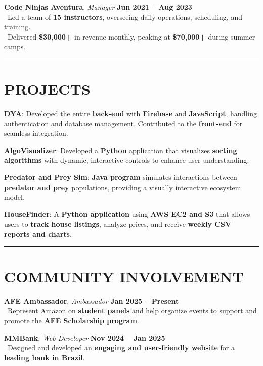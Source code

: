 \documentclass[a4paper,10pt]{article}
\newcommand{\sectionline}{\noindent\rule{\textwidth}{0.6pt}}
\begin{document}
\textbf{Code Ninjas Aventura}, \textit{Manager} \hfill \textbf{Jun 2021 – Aug 2023}\\
\textbullet\ Led a team of \textbf{15 instructors}, overseeing daily operations, scheduling, and training.\\
\textbullet\ Delivered \textbf{\$30,000+} in revenue monthly, peaking at \textbf{\$70,000+} during summer camps.

\sectionline

\section*{PROJECTS}
\begin{compactitem}
\item \textbf{DYA}: Developed the entire \textbf{back-end} with \textbf{Firebase} and \textbf{JavaScript}, handling authentication and database management. Contributed to the \textbf{front-end} for seamless integration.
\item \textbf{AlgoVisualizer}: Developed a \textbf{Python} application that visualizes \textbf{sorting algorithms} with dynamic, interactive controls to enhance user understanding.
\item \textbf{Predator and Prey Sim}: \textbf{Java program} simulates interactions between \textbf{predator and prey} populations, providing a visually interactive ecosystem model.
\item \textbf{HouseFinder}: A \textbf{Python application} using \textbf{AWS EC2 and S3} that allows users to \textbf{track house listings}, analyze prices, and receive \textbf{weekly CSV reports and charts}.
\end{compactitem}

\sectionline

\section*{COMMUNITY INVOLVEMENT}
\textbf{AFE Ambassador}, \textit{Ambassador} \hfill \textbf{Jan 2025 – Present}\\
\textbullet\ Represent Amazon on \textbf{student panels} and help organize events to support and promote the \textbf{AFE Scholarship program}.

\textbf{MMBank}, \textit{Web Developer} \hfill \textbf{Nov 2024 – Jan 2025}\\
\textbullet\ Designed and developed an \textbf{engaging and user-friendly website} for a \textbf{leading bank in Brazil}.
\end{document}
